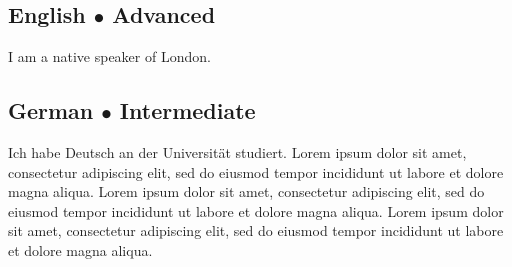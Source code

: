 \subsection{\fstar English $\bullet$ Advanced}
I am a native speaker of London.
\subsection{\mstar German $\bullet$ Intermediate}
Ich habe Deutsch an der Universität studiert.
Lorem ipsum dolor sit amet, consectetur adipiscing elit, sed do eiusmod tempor incididunt ut labore et dolore magna aliqua. 
Lorem ipsum dolor sit amet, consectetur adipiscing elit, sed do eiusmod tempor incididunt ut labore et dolore magna aliqua. 
Lorem ipsum dolor sit amet, consectetur adipiscing elit, sed do eiusmod tempor incididunt ut labore et dolore magna aliqua. 
